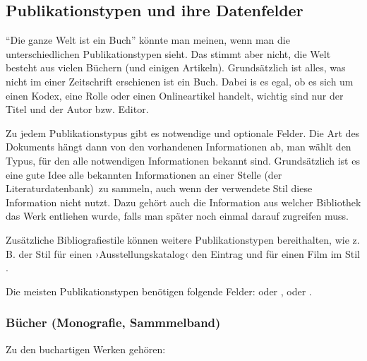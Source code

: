 \subsection{Publikationstypen und ihre Datenfelder}\label{lit:publikationstypus}

\enquote{Die ganze Welt ist ein Buch} könnte man meinen, wenn man die unterschiedlichen Publikationstypen sieht.
Das stimmt aber nicht, die Welt besteht aus vielen Büchern (und einigen Artikeln).
Grundsätzlich ist alles, was nicht im einer Zeitschrift erschienen ist ein Buch.
Dabei is es egal, ob es sich um einen Kodex, eine Rolle oder einen Onlineartikel handelt,
wichtig sind nur der Titel und der Autor bzw. Editor.

Zu jedem Publikationstypus gibt es notwendige und optionale Felder.
Die Art des Dokuments hängt dann von den vorhandenen Informationen ab, 
man wählt den Typus, für den alle notwendigen Informationen bekannt sind.
Grundsätzlich ist es eine gute Idee alle bekannten Informationen an einer Stelle (der Literaturdatenbank) zu sammeln,
auch wenn der verwendete Stil diese Information nicht nutzt.
Dazu gehört auch die Information aus welcher Bibliothek das Werk entliehen wurde, 
falls man später noch einmal darauf zugreifen muss.

Zusätzliche Bibliografiestile können weitere Publikationstypen bereithalten,
wie z.\,B. der Stil  für einen ›Ausstellungskatalog‹ den Eintrag  
und  für einen Film im Stil .

Die meisten Publikationstypen benötigen folgende Felder:
 oder 
,
 oder .

\subsubsection{Bücher (Monografie, Sammmelband)}

Zu den buchartigen Werken gehören: 

